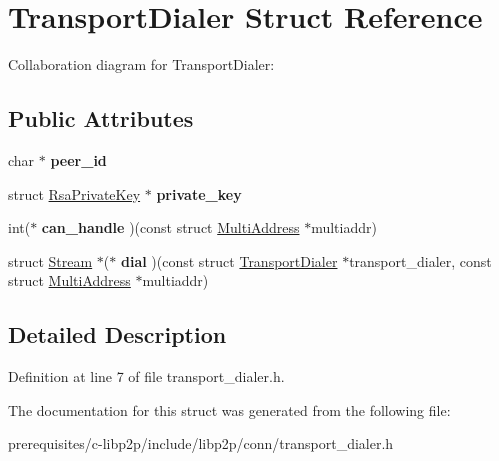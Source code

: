 \hypertarget{struct_transport_dialer}{}\section{Transport\+Dialer Struct Reference}
\label{struct_transport_dialer}


Collaboration diagram for Transport\+Dialer\+:
\subsection*{Public Attributes}
\begin{DoxyCompactItemize}
\item 
\mbox{\label{struct_transport_dialer_a2fb04324ca4cffc314c1a85d559ff53d}} 
char $\ast$ {\bfseries peer\+\_\+id}
\item 
\mbox{\label{struct_transport_dialer_a6e7e7414fdb1af87a46d02f5d42e4ae9}} 
struct \mbox{\hyperlink{struct_rsa_private_key}{Rsa\+Private\+Key}} $\ast$ {\bfseries private\+\_\+key}
\item 
\mbox{\label{struct_transport_dialer_a7dc3356cf4f2c4d5f802a1f3b86a2c2c}} 
int($\ast$ {\bfseries can\+\_\+handle} )(const struct \mbox{\hyperlink{struct_multi_address}{Multi\+Address}} $\ast$multiaddr)
\item 
\mbox{\label{struct_transport_dialer_a3d22f6248e2dd30259e14b1910a83fc8}} 
struct \mbox{\hyperlink{struct_stream}{Stream}} $\ast$($\ast$ {\bfseries dial} )(const struct \mbox{\hyperlink{struct_transport_dialer}{Transport\+Dialer}} $\ast$transport\+\_\+dialer, const struct \mbox{\hyperlink{struct_multi_address}{Multi\+Address}} $\ast$multiaddr)
\end{DoxyCompactItemize}


\subsection{Detailed Description}


Definition at line 7 of file transport\+\_\+dialer.\+h.



The documentation for this struct was generated from the following file\+:\begin{DoxyCompactItemize}
\item 
prerequisites/c-\/libp2p/include/libp2p/conn/transport\+\_\+dialer.\+h\end{DoxyCompactItemize}
